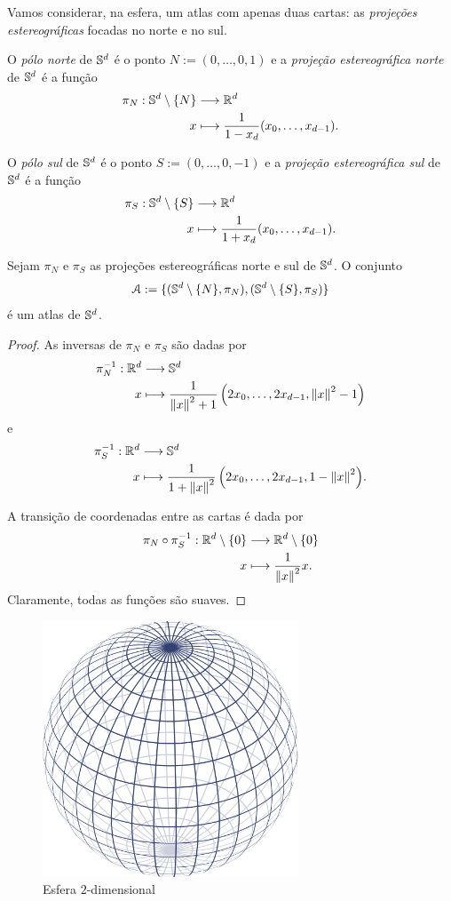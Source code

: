 Vamos considerar, na esfera, um atlas com apenas duas cartas: as \emph{projeções estereográficas} focadas no norte e no sul.

\begin{defi}
O \emph{pólo norte} de $\S^d$ é o ponto $N := (0,\ldots,0,1)$ e a \emph{projeção estereográfica norte} de $\S^d$ é a função
	\begin{align*}
	\func{\pi_N}{\S^d \setminus\{N\}}{\R^d}{x}{\frac{1}{1-x_d}(x_0,\ldots,x_{d-1})}.
	\end{align*}

O \emph{pólo sul} de $\S^d$ é o ponto $S := (0,\ldots,0,-1)$ e a \emph{projeção estereográfica sul} de $\S^d$ é a função
	\begin{align*}
	\func{\pi_S}{\S^d \setminus\{S\}}{\R^d}{x}{\frac{1}{1+x_d}(x_0,\ldots,x_{d-1})}.
	\end{align*}
\end{defi}

\begin{prop}
Sejam $\pi_N$ e $\pi_S$ as projeções estereográficas norte e sul de $\S^d$. O conjunto
	\begin{equation*}
	\atlas := \{(\S^d \setminus\{N\},\pi_N),(\S^d \setminus\{S\},\pi_S)\}
	\end{equation*}
é um atlas de $\S^d$.
\end{prop}
\begin{proof}
As inversas de $\pi_N$ e $\pi_S$ são dadas por
	\begin{align*}
	\func{\pi_N\inv}{\R^d}{\S^d}{x}{\frac{1}{\nor{x}^2 + 1}\left(2x_0,\ldots,2x_{d-1},\nor{x}^2 - 1\right)}
	\end{align*}
e
	\begin{align*}
	\func{\pi_S\inv}{\R^d}{\S^d}{x}{\frac{1}{1+\nor{x}^2}\left(2x_0,\ldots,2x_{d-1},1-\nor{x}^2\right)}.
	\end{align*}

A transição de coordenadas entre as cartas é dada por
	\begin{align*}
	\func{\pi_N \circ \pi_S\inv}{\R^d \setminus\{0\}}{\R^d \setminus\{0\}}{x}{\frac{1}{\nor{x}^2}x}.
	\end{align*}
Claramente, todas as funções são suaves.
\end{proof}

\begin{figure}[!h]
\centering
\includegraphics[width=3in]{./imagens/esfera}
\caption{Esfera $2$-dimensional}
\end{figure}

